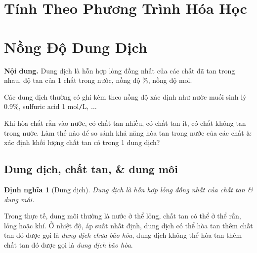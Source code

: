 \documentclass{article}
\newtheorem{dinhnghia}{Định nghĩa}
\begin{document}

\section{Tính Theo Phương Trình Hóa Học}

\noindent{}


\section{Nồng Độ Dung Dịch}
\textsf{\textbf{Nội dung.} Dung dịch là hỗn hợp lỏng đồng nhất của các chất đã tan trong nhau, độ tan của 1 chất trong nước, nồng độ \%, nồng độ mol.}

Các dung dịch thường có ghi kèm theo nồng độ xác định như nước muối sinh lý 0.9\%, sulfuric acid 1 mol\texttt{/}L, $\ldots$

Khi hòa chất rắn vào nước, có chất tan nhiều, có chất tan ít, có chất không tan trong nước. Làm thế nào để so sánh khả năng hòa tan trong nước của các chất \& xác định khối lượng chất tan có trong 1 dung dịch?

\subsection{Dung dịch, chất tan, \& dung môi}

\begin{dinhnghia}[Dung dịch]
	\emph{Dung dịch} là hỗn hợp lỏng đồng nhất của chất tan \& dung môi.
\end{dinhnghia}
Trong thực tế, dung môi thường là nước ở thể lỏng, chất tan có thể ở thể rắn, lỏng hoặc khí. Ở nhiệt độ, áp suất nhất định, dung dịch có thể hòa tan thêm chất tan đó được gọi là \textit{dung dịch chưa bão hòa}, dung dịch không thể hòa tan thêm chất tan đó được gọi là \textit{dung dịch bão hòa}.
\end{document}
